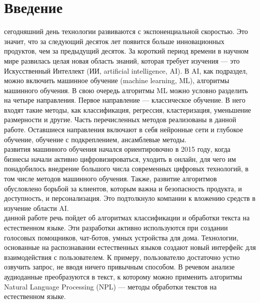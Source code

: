 \documentclass{article}
\newcommand\tab[1][1cm]{\hspace*{#1}}
\begin{document}
\renewcommand*\contentsname{Содержание}
\makeatletter
\renewcommand{\l@section}{\@dottedtocline{1}{0em}{2em}}
\renewcommand{\l@subsection}{\@dottedtocline{1}{0em}{2.6em}}
\renewcommand{\l@subsubsection}{\@dottedtocline{1}{0em}{3.2em}}

\makeatother
\setcounter{page}{2}

\begin{center}
	\tableofcontents
\end{center}
\newpage
{}
\section*{Введение}
 сегодняшний день технологии развиваются с экспоненциальной скоростью. Это значит, что за следующий десяток лет появится больше инновационных продуктов, чем за предыдущий десяток. За короткий период времени в научном мире развилась целая новая область знаний, которая требует изучения — это Искусственный Интеллект (ИИ, artificial intelligence, AI). В AI, как подраздел, можно включить машинное обучение (machine learning, ML), алгоритмы машинного обучения. В свою очередь алгоритмы ML можно условно разделить на четыре направления. Первое направление — классическое обучение. В него входят такие методы, как классификация, регрессия, кластеризация, уменьшение размерности и другие. Часть перечисленных методов реализованы в данной работе. Оставшиеся направления включают в себя нейронные сети и глубокое обучение, обучение с подкреплением, ансамблевые методы.\\
 развития машинного обучения начался ориентировочно в 2015 году, когда бизнесы начали активно цифровизироваться, уходить в онлайн, для чего им понадобилось внедрение большого числа современных цифровых технологий, в том числе методов машинного обучения. Также, развитие алгоритмов обусловлено борьбой за клиентов, которым важна и безопасность продукта, и доступность, и персонализация. Это подтолкнуло компании к вложению средств в изучение области AI.\\
 данной работе речь пойдет об алгоритмах классификации и обработки текста на естественном языке. Эти разработки активно используются при создании голосовых помощников, чат-ботов, умных устройства для дома. Технологии, основанные на распознавании естественных языков создают новый интерфейс для взаимодействия с пользователем. К примеру, пользователю достаточно устно озвучить запрос, не вводя ничего привычным способом. В речевом анализе аудиоданные преобразуются в текст, к которому можно применить алгоритмы Natural Language Processing (NPL) — методы обработки текстов на естественном языке.\\
\end{document}
